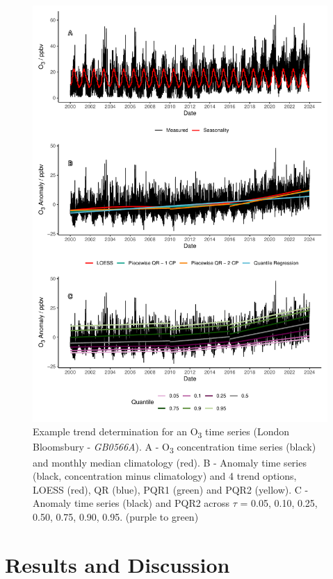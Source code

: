 \documentclass[journal abbreviation, manuscript]{copernicus}
\begin{document}
\begin{figure}[p]
\includegraphics[width=12cm]{figures/f1_method.pdf}
\caption{Example trend determination for an O\textsubscript{3} time series (London Bloomsbury - \textit{GB0566A}). A - O\textsubscript{3} concentration time series (black) and monthly median climatology (red). B - Anomaly time series (black, concentration minus climatology) and 4 trend options, LOESS (red), QR (blue), PQR1 (green) and PQR2 (yellow). C - Anomaly time series (black) and PQR2 across $\tau$ = 0.05, 0.10, 0.25, 0.50, 0.75, 0.90, 0.95. (purple to green)}
\label{fig:method_plot}
\end{figure}


\clearpage
\section{Results and Discussion}
\end{document}
